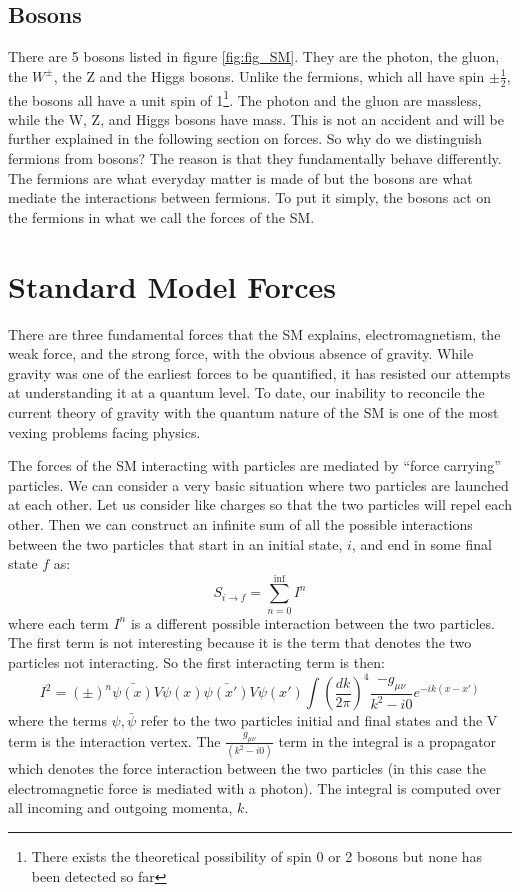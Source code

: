 \subsection{Bosons}
There are 5 bosons listed in figure \ref{fig:fig_SM}. They are the photon, the gluon, the $W^{\pm}$, the Z and the Higgs bosons.
Unlike the fermions, which all have spin $\pm \frac{1}{2}$, the bosons all have a unit spin of 1\footnote{There exists the theoretical possibility of spin 0 or 2 bosons but none has been detected so far}.
The photon and the gluon are massless, while the W, Z, and Higgs bosons have mass. This is not an accident and will be further explained in the following section on forces. So why do we distinguish fermions from bosons?
The reason is that they fundamentally behave differently. The fermions are what everyday matter is made of but the bosons are what mediate the interactions between fermions. 
To put it simply, the bosons act on the fermions in what we call the forces of the SM.\\

\section{Standard Model Forces}
There are three fundamental forces that the SM explains, electromagnetism, the weak force, and the strong force, with the obvious absence of gravity.
While gravity was one of the earliest forces to be quantified, it has resisted our attempts at understanding it at a quantum level.
To date, our inability to reconcile the current theory of gravity with the quantum nature of the SM is one of the most vexing problems facing physics.

The forces of the SM interacting with particles are mediated by ``force carrying'' particles.
We can consider a very basic situation where two particles are launched at each other. Let us consider like charges so that the two particles will repel each other.
Then we can construct an infinite sum of all the possible interactions between the two particles that start in an initial state, $i$, and end in some final state $f$ as:
\begin{equation}
S_{i \rightarrow f} = \sum_{n=0}^{\inf} I^{n} 
\end{equation}
where each term $I^{n}$ is a different possible interaction between the two particles. The first term is not interesting because it is the term that denotes the two particles not interacting.
So the first interacting term is then:
\begin{equation}
I^2 =  (\pm)^n \bar{\psi(x)} V \psi(x)\bar{\psi(x')} V \psi(x') \int (\frac{dk}{2 \pi})^4 \frac{-g_{\mu \nu}}{k^2 - i0} e^{-ik(x-x')}
\label{eq:eq_baseIntegral}
\end{equation}
where the terms $\psi, \bar{\psi}$ refer to the two particles initial and final states and the V term is the interaction vertex. 
The $\frac{g_{\mu \nu}}{(k^2 - i0)}$ term in the integral is a propagator which denotes the force interaction between the two particles (in this case the electromagnetic force is mediated with a photon). The integral is computed over all incoming and outgoing momenta, $k$.
\\

